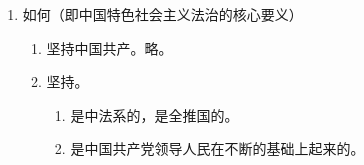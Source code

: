 \begin{enumerate}
\begin{enumerate}
\begin{enumerate}
\begin{enumerate}
                          \item {}。
                          \item 中法路是建法系，建法国的。
                        \end{enumerate}
                  \item 优势。
                        \begin{enumerate}
                          \item 中法路是的法治道路，
                          \item 根植于我国社会主义初级阶段的，生发于我国和的具体实践，
                          \item 是的我国基本、符合人民、符合要求的法治道路，
                          \item {}。
                        \end{enumerate}
                  \item 要求。
                        \begin{enumerate}
                          \item 要在坚持中法路这个根本问题上的，
                          \item 从中国实际出发，中国特色、实践特色、时代特色，
                          \item {}罔顾国情、超越阶段，因循守旧、墨守成规，
                          \item 努力各项法治工作的，借鉴但决西方国家的法治经验和道路。
                        \end{enumerate}
                \end{enumerate}
          \item 如何（即中国特色社会主义法治的核心要义）
                \begin{enumerate}
                  \item 坚持中国共产。略。
                  \item 坚持。
                        \begin{enumerate}
                          \item \blh 是中法系的，是全推国的。
                          \item \blh 是中国共产党领导人民在不断的基础上起来的。

\end{enumerate}
\end{enumerate}
\end{enumerate}
\end{enumerate}
